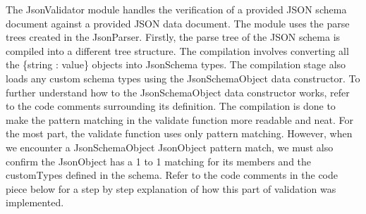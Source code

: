 \documentclass[a4paper]{article}
\begin{document}
The JsonValidator module handles the verification of a provided JSON schema document against
a provided JSON data document. The module uses the parse trees created in
the JsonParser. Firstly, the parse tree of the JSON schema is compiled into a different tree structure. 
The compilation involves converting all the \{string : value\} objects into JsonSchema types.
The compilation stage also loads any custom schema types using the JsonSchemaObject data constructor.
To further understand how to the JsonSchemaObject data constructor works, refer to the code comments surrounding 
its definition.\newline
The compilation is done to make the pattern matching in the validate function more readable and neat.
\newline\newline
For the most part, the validate function uses only pattern matching. However, when we encounter a
JsonSchemaObject JsonObject pattern match, we must also confirm the JsonObject has a 1 to 1 matching
for its members and the customTypes defined in the schema. Refer to the code comments in the code piece 
below for a step by step explanation of how this part of validation was implemented.


\end{document}
